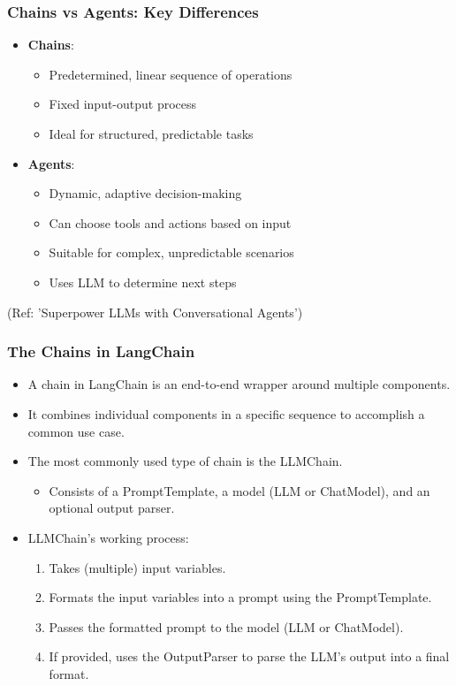 \begin{frame}\frametitle{Chains vs Agents: Key Differences}

\begin{itemize}
\item \textbf{Chains}:
    \begin{itemize}
    \item Predetermined, linear sequence of operations
    \item Fixed input-output process
    \item Ideal for structured, predictable tasks
    \end{itemize}

\item \textbf{Agents}:
    \begin{itemize}
    \item Dynamic, adaptive decision-making
    \item Can choose tools and actions based on input
    \item Suitable for complex, unpredictable scenarios
    \item Uses LLM to determine next steps
    \end{itemize}
\end{itemize}

{\tiny (Ref: 'Superpower LLMs with Conversational Agents')}
\end{frame}

\begin{frame}[fragile]
\frametitle{The Chains in LangChain}

\begin{itemize}
    \item A chain in LangChain is an end-to-end wrapper around multiple components.
    \item It combines individual components in a specific sequence to accomplish a common use case.
    \item The most commonly used type of chain is the LLMChain.
    \begin{itemize}
        \item Consists of a PromptTemplate, a model (LLM or ChatModel), and an optional output parser.
    \end{itemize}
    \item LLMChain's working process:
    \begin{enumerate}
        \item Takes (multiple) input variables.
        \item Formats the input variables into a prompt using the PromptTemplate.
        \item Passes the formatted prompt to the model (LLM or ChatModel).
        \item If provided, uses the OutputParser to parse the LLM's output into a final format.
    \end{enumerate}
\end{itemize}

\end{frame}


